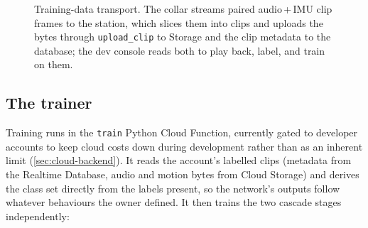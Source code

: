 \begin{figure}[ht]\centering
  \caption{Training-data transport. The collar streams paired audio\,+\,IMU clip frames to the station,
           which slices them into clips and uploads the bytes through \texttt{upload\_clip} to Storage
           and the clip metadata to the database; the dev console reads both to play back, label, and
           train on them.}
  \label{fig:capture-flow}
\end{figure}

\subsection{The trainer}

Training runs in the \texttt{train} Python Cloud Function, currently gated to developer accounts to
keep cloud costs down during development rather than as an inherent limit (\cref{sec:cloud-backend}).
It reads the account's labelled clips (metadata from the Realtime
Database, audio and motion bytes from Cloud Storage) and derives the class set directly from the
labels present, so the network's outputs follow whatever behaviours the owner defined. It then trains
the two cascade stages independently:

